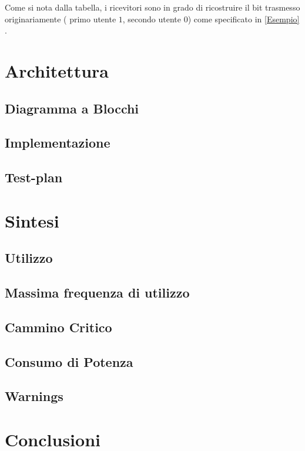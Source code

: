 \documentclass[a4paper,12pt]{article}
\begin{document}
    Come si nota dalla tabella, i ricevitori sono in grado di ricostruire il bit trasmesso originariamente ( primo utente
     $1$, secondo utente $0$) come specificato in \ref{Esempio} .


\section{Architettura}
  \subsection{Diagramma a Blocchi}
  \subsection{Implementazione}
  \subsection{Test-plan}
\section{Sintesi} 
  \subsection{Utilizzo}
  \subsection{Massima frequenza di utilizzo}
  \subsection{Cammino Critico}
  \subsection{Consumo di Potenza}
  \subsection{Warnings}
\section{Conclusioni}
\end{document}

